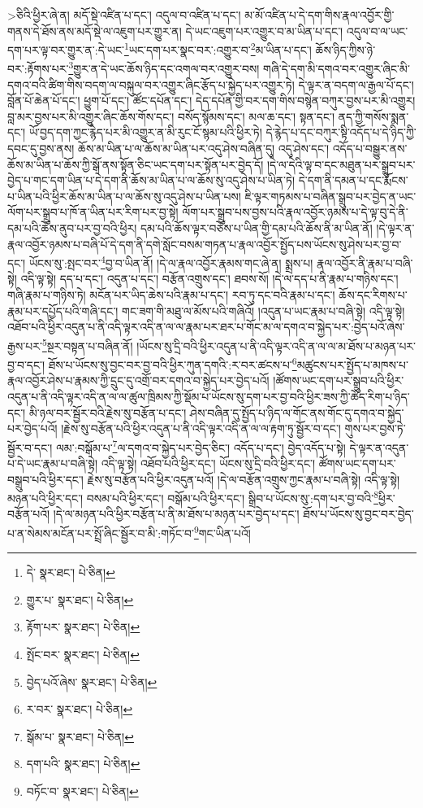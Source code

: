 >ཅིའི་ཕྱིར་ཞེ་ན། མདོ་སྡེ་འཛིན་པ་དང་། འདུལ་བ་འཛིན་པ་དང་། མ་མོ་འཛིན་པ་དེ་དག་གིས་རྣལ་འབྱོར་གྱི་གནས་དེ་ཐོས་ནས་མདོ་སྡེ་ལ་འཇུག་པར་གྱུར་ན། དེ་ཡང་འཇུག་པར་འགྱུར་བ་མ་ཡིན་པ་དང་། འདུལ་བ་ལ་ཡང་དག་པར་ལྟ་བར་གྱུར་ན་:དེ་ཡང་\footnote{དེ་  སྣར་ཐང་།  པེ་ཅིན། }ཡང་དག་པར་སྣང་བར་:འགྱུར་བ་\footnote{གྱུར་པ་  སྣར་ཐང་།  པེ་ཅིན། }མ་ཡིན་པ་དང་། ཆོས་ཉིད་ཀྱིས་ཉེ་བར་:རྟོགས་པར་\footnote{རྟོག་པར་  སྣར་ཐང་།  པེ་ཅིན། }གྱུར་ན་དེ་ཡང་ཆོས་ཉིད་དང་འགལ་བར་འགྱུར་བས། གཞི་དེ་དག་མི་དགའ་བར་འགྱུར་ཞིང་མི་དགའ་བའི་ཚིག་གིས་བདག་ལ་བསྐུལ་བར་འགྱུར་ཞིང་རྩོད་པ་སྐྱེད་པར་འགྱུར་ཏེ། དེ་ལྟར་ན་བདག་ལ་རྒྱལ་པོ་དང་། བློན་པོ་ཆེན་པོ་དང་། ཕྱུག་པོ་དང་། ཚོང་དཔོན་དང་། དེད་དཔོན་གྱི་བར་དག་གིས་བསྙེན་བཀུར་བྱས་པར་མི་འགྱུར། བླ་མར་བྱས་པར་མི་འགྱུར་ཞིང་ཆོས་གོས་དང་། བསོད་སྙོམས་དང་། མལ་ཆ་དང་། སྟན་དང་། ནད་ཀྱི་གསོས་སྨན་དང་། ཡོ་བྱད་དག་ཀྱང་རྙེད་པར་མི་འགྱུར་ན་མི་རུང་ངོ་སྙམ་པའི་ཕྱིར་ཏེ། དེ་རྙེད་པ་དང་བཀུར་སྟི་འདོད་པ་དེ་ཉིད་ཀྱི་དབང་དུ་བྱས་ནས། ཆོས་མ་ཡིན་པ་ལ་ཆོས་མ་ཡིན་པར་འདུ་ཤེས་བཞིན་དུ། འདུ་ཤེས་དང་། འདོད་པ་བསྒྱུར་ནས་ཆོས་མ་ཡིན་པ་ཆོས་ཀྱི་སྒོ་ནས་སྟོན་ཅིང་ཡང་དག་པར་སྟོན་པར་བྱེད་དོ། །དེ་ལ་དེའི་ལྟ་བ་དང་མཐུན་པར་སྒྲུབ་པར་བྱེད་པ་གང་དག་ཡིན་པ་དེ་དག་ནི་ཆོས་མ་ཡིན་པ་ལ་ཆོས་སུ་འདུ་ཤེས་པ་ཡིན་ཏེ། དེ་དག་ནི་དམན་པ་དང་རྨོངས་པ་ཡིན་པའི་ཕྱིར་ཆོས་མ་ཡིན་པ་ལ་ཆོས་སུ་འདུ་ཤེས་པ་ཡིན་པས། ཇི་ལྟར་གཏམས་པ་བཞིན་སྒྲུབ་པར་བྱེད་ན་ཡང་ལོག་པར་སྒྲུབ་པ་ཁོ་ན་ཡིན་པར་རིག་པར་བྱ་སྟེ། ལོག་པར་སྒྲུབ་པས་བྱས་པའི་རྣལ་འབྱོར་ཉམས་པ་དེ་ལྟ་བུ་དེ་ནི་དམ་པའི་ཆོས་ནུབ་པར་བྱ་བའི་ཕྱིར། དམ་པའི་ཆོས་ལྟར་བཅོས་པ་ཡིན་གྱི་དམ་པའི་ཆོས་ནི་མ་ཡིན་ནོ། །དེ་ལྟར་ན་རྣལ་འབྱོར་ཉམས་པ་བཞི་པོ་དེ་དག་ནི་དགེ་སློང་བསམ་གཏན་པ་རྣལ་འབྱོར་སྤྱོད་པས་ཡོངས་སུ་ཤེས་པར་བྱ་བ་དང་། ཡོངས་སུ་:སྤང་བར་\footnote{སྤོང་བར་  སྣར་ཐང་།  པེ་ཅིན། }བྱ་བ་ཡིན་ནོ། །དེ་ལ་རྣལ་འབྱོར་རྣམས་གང་ཞེ་ན། སྨྲས་པ། རྣལ་འབྱོར་ནི་རྣམ་པ་བཞི་སྟེ། འདི་ལྟ་སྟེ། དད་པ་དང་། འདུན་པ་དང་། བརྩོན་འགྲུས་དང་། ཐབས་སོ། །དེ་ལ་དད་པ་ནི་རྣམ་པ་གཉིས་དང་། གཞི་རྣམ་པ་གཉིས་ཏེ། མངོན་པར་ཡིད་ཆེས་པའི་རྣམ་པ་དང་། རབ་ཏུ་དང་བའི་རྣམ་པ་དང་། ཆོས་དང་རིགས་པ་རྣམ་པར་དཔྱོད་པའི་གཞི་དང་། གང་ཟག་གི་མཐུ་ལ་མོས་པའི་གཞིའོ། །འདུན་པ་ཡང་རྣམ་པ་བཞི་སྟེ། འདི་ལྟ་སྟེ། འཐོབ་པའི་ཕྱིར་འདུན་པ་ནི་འདི་ལྟར་འདི་ན་ལ་ལ་རྣམ་པར་ཐར་པ་གོང་མ་ལ་དགའ་བ་སྐྱེད་པར་:བྱེད་པའོ་ཞེས་རྒྱས་པར་\footnote{བྱེད་པའོ་ཞེས་  སྣར་ཐང་།  པེ་ཅིན། }སྔར་བསྟན་པ་བཞིན་ནོ། །ཡོངས་སུ་དྲི་བའི་ཕྱིར་འདུན་པ་ནི་འདི་ལྟར་འདི་ན་ལ་ལ་མ་ཐོས་པ་མཉན་པར་བྱ་བ་དང་། ཐོས་པ་ཡོངས་སུ་བྱང་བར་བྱ་བའི་ཕྱིར་ཀུན་དགའི་:ར་བར་ཚངས་པ་\footnote{ར་བར་  སྣར་ཐང་།  པེ་ཅིན། }མཚུངས་པར་སྤྱོད་པ་མཁས་པ་རྣལ་འབྱོར་ཤེས་པ་རྣམས་ཀྱི་དྲུང་དུ་འགྲོ་བར་དགའ་བ་སྐྱེད་པར་བྱེད་པའོ། །ཚོགས་ཡང་དག་པར་སྒྲུབ་པའི་ཕྱིར་འདུན་པ་ནི་འདི་ལྟར་འདི་ན་ལ་ལ་ཚུལ་ཁྲིམས་ཀྱི་སྡོམ་པ་ཡོངས་སུ་དག་པར་བྱ་བའི་ཕྱིར་ཟས་ཀྱི་ཚོད་རིག་པ་ཉིད་དང་། མི་ཉལ་བར་སྦྱོར་བའི་རྗེས་སུ་བརྩོན་པ་དང་། ཤེས་བཞིན་དུ་སྤྱོད་པ་ཉིད་ལ་གོང་ནས་གོང་དུ་དགའ་བ་སྐྱེད་པར་བྱེད་པའོ། །རྗེས་སུ་བརྩོན་པའི་ཕྱིར་འདུན་པ་ནི་འདི་ལྟར་འདི་ན་ལ་ལ་རྟག་ཏུ་སྦྱོར་བ་དང་། གུས་པར་བྱས་ཏེ་སྦྱོར་བ་དང་། ལམ་:བསྒོམ་པ་\footnote{སྒོམ་པ་  སྣར་ཐང་།  པེ་ཅིན། }ལ་དགའ་བ་སྐྱེད་པར་བྱེད་ཅིང་། འདོད་པ་དང་། བྱེད་འདོད་པ་སྟེ། དེ་ལྟར་ན་འདུན་པ་དེ་ཡང་རྣམ་པ་བཞི་སྟེ། འདི་ལྟ་སྟེ། འཐོབ་པའི་ཕྱིར་དང་། ཡོངས་སུ་དྲི་བའི་ཕྱིར་དང་། ཚོགས་ཡང་དག་པར་བསྒྲུབ་པའི་ཕྱིར་དང་། རྗེས་སུ་བརྩོན་པའི་ཕྱིར་འདུན་པའོ། །དེ་ལ་བརྩོན་འགྲུས་ཀྱང་རྣམ་པ་བཞི་སྟེ། འདི་ལྟ་སྟེ། མཉན་པའི་ཕྱིར་དང་། བསམ་པའི་ཕྱིར་དང་། བསྒོམ་པའི་ཕྱིར་དང་། སྒྲིབ་པ་ཡོངས་སུ་:དག་པར་བྱ་བའི་\footnote{དག་པའི་  སྣར་ཐང་།  པེ་ཅིན། }ཕྱིར་བརྩོན་པའོ། །དེ་ལ་མཉན་པའི་ཕྱིར་བརྩོན་པ་ནི་མ་ཐོས་པ་མཉན་པར་བྱེད་པ་དང་། ཐོས་པ་ཡོངས་སུ་བྱང་བར་བྱེད་པ་ན་སེམས་མངོན་པར་སྤྲོ་ཞིང་སྦྱོར་བ་མི་:གཏོང་བ་\footnote{བཏོང་བ་  སྣར་ཐང་།  པེ་ཅིན། }གང་ཡིན་པའོ། 